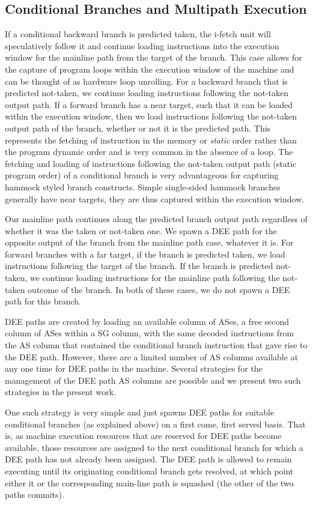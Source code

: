 \documentclass[10pt,dvips]{article}
\begin{document}
\subsection{Conditional Branches and Multipath Execution}
%
If a conditional backward branch is predicted taken,
the i-fetch unit
will speculatively follow it and continue loading instructions
into the execution window for the mainline path from the target
of the branch.  
This case allows for the capture of program loops
within the execution window of the machine and can be thought of
as hardware loop unrolling.
For a backward branch that
is predicted not-taken, we continue loading instructions following the
not-taken output path.
If a forward branch has a near target, such
that it can be loaded within the execution window, 
then we load instructions following the
not-taken output path of the branch, whether or not it is the predicted path.
This represents the fetching of instruction in the 
memory or \textit{static} order rather than the program dynamic order and
is very common in the absence of a loop.
The fetching and loading of instructions following the
not-taken output path (static program order) of a conditional
branch is very advantageous for 
capturing hammock styled branch constructs.  
Simple single-sided hammock branches generally have near targets,
they are thus captured within the execution window.

Our mainline path continues along the predicted branch output path
regardless of whether it was the taken or not-taken one.  
We spawn a DEE path
for the opposite output of the branch from
the mainline path case, whatever it is.
For forward branches with a far target,
if the branch is predicted taken, we load instructions following the target
of the branch.  If the branch is predicted not-taken, we continue
loading instructions for the mainline path following the not-taken
outcome of the branch.  In both of these cases, we do not
spawn a DEE path for this branch.

DEE paths are created by loading an available
column of ASes, a free second column of ASes within a SG column, with
the same decoded instructions from the AS column that contained
the conditional branch instruction that gave rise to the DEE path.
However, there are a limited number of AS columns
available at any one time for DEE paths in the machine.
Several strategies for the management of the DEE path AS columns 
are
possible and we present two such strategies in the present work.

One such strategy is very simple and just 
spawns DEE paths for suitable conditional
branches (as explained above) on a first come, first served basis.  
That is, as machine
execution resources that are reserved for DEE paths
become available, those resources are assigned to the next conditional
branch for which a DEE path has not already 
been assigned.  The DEE path is allowed to
remain executing until its originating conditional
branch gets resolved, at which point either it or the corresponding
main-line path is squashed (the other of the two paths commits).
\end{document}
